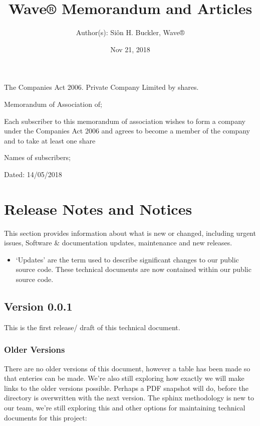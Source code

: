 \documentclass[letterpaper,10pt,english]{sphinxmanual}
\title{Wave® Memorandum and Articles}
\date{Nov 21, 2018}
\author{Author(s): Siôn H. Buckler, Wave®}
\begin{document}
\pagestyle{empty}
\maketitle
\pagestyle{plain}
\sphinxtableofcontents
\pagestyle{normal}
\label{\detokenize{index::doc}}


The Companies Act 2006. Private Company Limited by shares.

Memorandum of Association of; 

Each subscriber to this memorandum of association wishes to form a company under the Companies Act 2006 and agrees to become a member of the company and to take at least one share

Names of subscribers; 

Dated: 14/05/2018


\chapter{Release Notes and Notices}
\label{\detokenize{releasenotes:release-notes-and-notices}}\label{\detokenize{releasenotes::doc}}
This section provides information about what is new or changed, including urgent issues, Software \& documentation updates, maintenance and new releases.
\begin{itemize}
\item {} 
‘Updates’ are the term used to describe significant changes to our public source code. These technical documents are now contained within our public source code.

\end{itemize}


\section{Version 0.0.1}
\label{\detokenize{releasenotes:version-0-0-1}}
This is the first release/ draft of this technical document.


\subsection{Older Versions}
\label{\detokenize{releasenotes:older-versions}}
There are no older versions of this document, however a table has been made so that enteries can be made. We’re also still exploring how exactly we will make links to the older versions possible. Perhaps a PDF snapshot will do, before the directory is overwritten with the next version. The sphinx methodology is new to our team, we’re still exploring this and other options for maintaining technical documents for this project:
\end{document}
